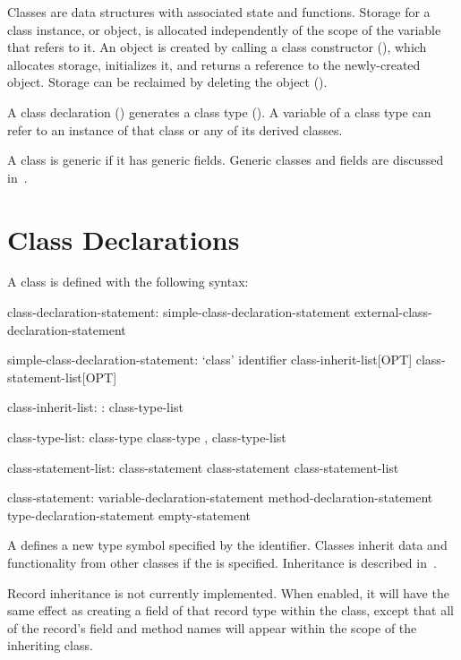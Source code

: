 \label{Classes}

Classes are data structures with associated state and functions. Storage for
a class instance, or object, is allocated independently of the scope of
the variable that refers to it.
An object is created by calling a class constructor
(), which allocates storage, initializes it,
and returns a reference to the newly-created object.
Storage can be reclaimed by deleting the object ().

A class declaration () generates a class
type ().  A variable of a class type can refer to an
instance of that class or any of its derived classes.

A class is generic if it has generic fields. Generic classes and fields
are discussed in~.

\section{Class Declarations}
\label{Class_Declarations}

A class is defined with the following syntax:
\begin{syntax}
class-declaration-statement:
  simple-class-declaration-statement
  external-class-declaration-statement

simple-class-declaration-statement:
  `class' identifier class-inherit-list[OPT] { class-statement-list[OPT] }

class-inherit-list:
  : class-type-list

class-type-list:
  class-type
  class-type , class-type-list

class-statement-list:
  class-statement
  class-statement class-statement-list

class-statement:
  variable-declaration-statement
  method-declaration-statement
  type-declaration-statement
  empty-statement
\end{syntax}

A  defines a new type symbol
specified by the identifier.  Classes inherit data and functionality
from other classes %
if the  is specified.
Inheritance is described in~.

\begin{future}
Record inheritance is not currently implemented.  When enabled, it will have the
same effect as creating a field of that record type within the class, except
that all of the record's field and method names will appear within the scope of
the inheriting class.
\end{future}

